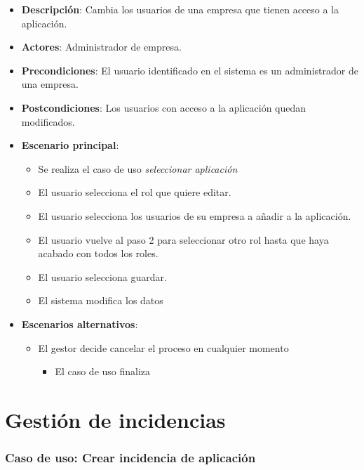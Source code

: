 \documentclass[12pt,a4paperpaper,]{report}
\providecommand{\tightlist}{%
  \setlength{\itemsep}{0pt}\setlength{\parskip}{0pt}}
\begin{document}
\begin{itemize}
\tightlist
\item
  \textbf{Descripción}: Cambia los usuarios de una empresa que tienen
  acceso a la aplicación.
\item
  \textbf{Actores}: Administrador de empresa.
\item
  \textbf{Precondiciones}: El usuario identificado en el sistema es un
  administrador de una empresa.
\item
  \textbf{Postcondiciones}: Los usuarios con acceso a la aplicación
  quedan modificados.
\item
  \textbf{Escenario principal}:

  \begin{itemize}
  \tightlist
  \item
    Se realiza el caso de uso \emph{seleccionar aplicación}
  \item
    El usuario selecciona el rol que quiere editar.
  \item
    El usuario selecciona los usuarios de su empresa a añadir a la
    aplicación.
  \item
    El usuario vuelve al paso 2 para seleccionar otro rol hasta que haya
    acabado con todos los roles.
  \item
    El usuario selecciona guardar.
  \item
    El sistema modifica los datos
  \end{itemize}
\item
  \textbf{Escenarios alternativos}:

  \begin{itemize}
  \tightlist
  \item
    El gestor decide cancelar el proceso en cualquier momento

    \begin{itemize}
    \tightlist
    \item
      El caso de uso finaliza
    \end{itemize}
  \end{itemize}
\end{itemize}

\section{Gestión de incidencias}\label{gestiuxf3n-de-incidencias}

\subsubsection{Caso de uso: Crear incidencia de
aplicación}\label{caso-de-uso-crear-incidencia-de-aplicaciuxf3n}
\end{document}

